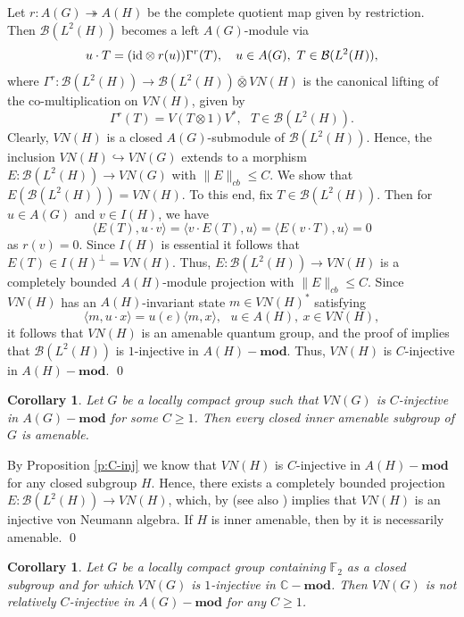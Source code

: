 \documentclass[preprint,12pt]{elsarticle}
\newtheorem{cor}[thm]{Corollary}
\newcommand{\mc}[1]{\mathcal{#1}}
\newcommand{\la}{\langle}
\newcommand{\ra}{\rangle}
\newcommand{\LG}{VN(G)}
\newcommand{\Gam}{\Gamma}
\newcommand{\ten}{\otimes}
\newcommand{\oten}{\overline{\otimes}}
\newcommand{\id}{\textnormal{id}}
\providecommand{\norm}[1]{\lVert#1\rVert}
\newcommand{\F}{\mathbb{F}}
\newcommand{\C}{\mathbb{C}}
\begin{document}
\begin{pf} Let $r:A(G)\twoheadrightarrow A(H)$ be the complete quotient map given by restriction. Then $\mc{B}(L^2(H))$ becomes a left $A(G)$-module via
$$u\cdot T=(\id\ten r(u))\Gam^r(T), \ \ \ u\in A(G), \ T\in\mc{B}(L^2(H)),$$
where $\Gam^r:\mc{B}(L^2(H))\rightarrow\mc{B}(L^2(H))\oten VN(H)$ is the canonical lifting of the co-multiplication on $VN(H)$, given by
$$\Gam^r(T)=V(T\ten 1)V^*, \ \ \ T\in\mc{B}(L^2(H)).$$
Clearly, $VN(H)$ is a closed $A(G)$-submodule of $\mc{B}(L^2(H))$. Hence, the inclusion $VN(H)\hookrightarrow\LG$ extends to a morphism $E:\mc{B}(L^2(H))\rightarrow\LG$ with $\norm{E}_{cb}\leq C$. We show that $E(\mc{B}(L^2(H)))=VN(H)$. To this end, fix $T\in \mc{B}(L^2(H))$. Then for $u\in A(G)$ and $v\in I(H)$, we have
$$\la E(T),u\cdot v\ra=\la v\cdot E(T),u\ra=\la E(v\cdot T),u\ra=0$$
as $r(v)=0$. Since $I(H)$ is essential it follows that $E(T)\in I(H)^{\perp}=VN(H)$. Thus, $E:\mc{B}(L^2(H))\rightarrow VN(H)$ is a completely bounded $A(H)$-module projection with $\norm{E}_{cb}\leq C$. Since $VN(H)$ has an $A(H)$-invariant state $m\in VN(H)^*$ satisfying
$$\la m,u\cdot x\ra=u(e)\la m,x\ra, \ \ \ u\in A(H), \ x\in VN(H),$$
it follows that $VN(H)$ is an amenable quantum group, and the proof of \cite[Theorem 5.5]{CN} implies that $\mc{B}(L^2(H))$ is $1$-injective in $A(H)-\mathbf{mod}$. Thus, $VN(H)$ is $C$-injective in $A(H)-\mathbf{mod}$.
\qed\end{pf}

\begin{cor}\label{c:C-inj} Let $G$ be a locally compact group such that $\LG$ is $C$-injective in $A(G)-\mathbf{mod}$ for some $C\geq 1$. Then every closed inner amenable subgroup of $G$ is amenable.
\end{cor}

\begin{pf} By Proposition \ref{p:C-inj} we know that $VN(H)$ is $C$-injective in $A(H)-\mathbf{mod}$ for any closed subgroup $H$. Hence, there exists a completely bounded projection $E:\mc{B}(L^2(H))\rightarrow VN(H)$, which, by \cite[Theoerem 3.1]{CS} (see also \cite{Pi}) implies that $VN(H)$ is an injective von Neumann algebra. If $H$ is inner amenable, then by \cite[Corollary 3.2]{LP1} it is necessarily amenable.
\qed\end{pf}

\begin{cor}\label{c:F_2} Let $G$ be a locally compact group containing $\F_2$ as a closed subgroup and for which $\LG$ is $1$-injective in $\C-\mathbf{mod}$. Then $\LG$ is not relatively $C$-injective in $A(G)-\mathbf{mod}$ for any $C\geq1$.
\end{cor}
\end{document}

